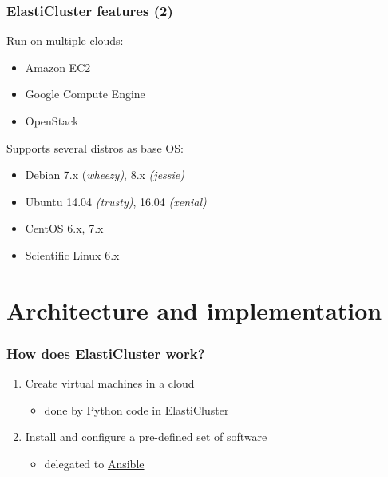 \documentclass[english,serif,mathserif,usenames,dvipsnames]{beamer}
\begin{document}
\begin{frame}
  \frametitle{ElastiCluster features (2)}

  Run on multiple clouds:
  \begin{itemize}
  \item Amazon EC2
  \item Google Compute Engine
  \item OpenStack
  \end{itemize}

  \+
  Supports several distros as base OS:
  \begin{itemize}
  \item Debian 7.x (\emph{wheezy)}, 8.x \emph{(jessie)}
  \item Ubuntu 14.04 \emph{(trusty)}, 16.04 \emph{(xenial)}
  \item CentOS 6.x, 7.x
  \item Scientific Linux 6.x
  \end{itemize}
\end{frame}


\section{Architecture and implementation}
\begin{frame}
  \frametitle{How does ElastiCluster work?}

  \begin{enumerate}
  \item Create virtual machines in a cloud
    \begin{itemize}
    \item done by Python code in ElastiCluster
    \end{itemize}

  \item Install and configure a pre-defined set of software
    \begin{itemize}
    \item delegated to \href{http://www.ansible.com}{Ansible}
    \end{itemize}
  \end{enumerate}
\end{frame}
\end{document}
